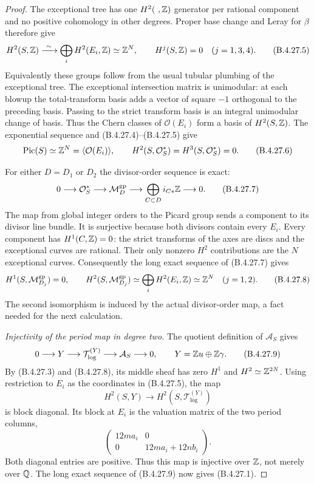 \begin{proof}
The exceptional tree has one $H^2(\ ,\mathbb Z)$
generator per rational component and no positive
cohomology in other degrees. Proper base change
and Leray for $\beta$ therefore give
\[
 H^2(S,\Z)\xrightarrow{\ \sim\ }
       \bigoplus_i H^2(E_i,\Z)\simeq\Z^N,
 \qquad H^j(S,\Z)=0\quad(j=1,3,4).
 \tag{B.4.27.5}
\]
Equivalently these groups follow from the usual
tubular plumbing of the exceptional tree.
The exceptional intersection matrix is
unimodular: at each blowup the total-transform
basis adds a vector of square $-1$ orthogonal
to the preceding basis. Passing to the strict
transform basis is an integral unimodular
change of basis. Thus the Chern classes of
$\mathcal O(E_i)$ form a basis of
$H^2(S,\mathbb Z)$. The exponential sequence and
(B.4.27.4)--(B.4.27.5) give
\[
 \operatorname{Pic}(S)\simeq\mathbb Z^N
       =\langle\mathcal O(E_i)\rangle,
 \qquad
 H^2(S,\mathcal O_S^*)=H^3(S,\mathcal O_S^*)=0.
 \tag{B.4.27.6}
\]

For either $D=D_1$ or $D_2$ the divisor-order
sequence is exact:
\[
 0\longrightarrow\mathcal O_S^*
 \longrightarrow\mathcal M_D^{\mathrm{gp}}
 \longrightarrow
   \bigoplus_{C\subset D}i_{C*}\mathbb Z
 \longrightarrow0.
 \tag{B.4.27.7}
\]
The map from global integer orders to the Picard
group sends a component to its divisor line
bundle. It is surjective because both divisors
contain every $E_i$. Every component has
$H^1(C,\mathbb Z)=0$: the strict transforms of the
axes are discs and the exceptional curves are
rational. Their only nonzero $H^2$ contributions
are the $N$ exceptional curves. Consequently
the long exact sequence of (B.4.27.7) gives
\[
 H^1(S,\mathcal M_{D_j}^{\mathrm{gp}})=0,
 \qquad
 H^2(S,\mathcal M_{D_j}^{\mathrm{gp}})
       \simeq\bigoplus_i H^2(E_i,\mathbb Z)
       \simeq\mathbb Z^N\quad(j=1,2).
 \tag{B.4.27.8}
\]
The second isomorphism is induced by the actual
divisor-order map, a fact needed for the next
calculation.

\emph{Injectivity of the period map in degree two.}
The quotient definition of $\mathcal A_S$ gives
\[
 0\longrightarrow Y\longrightarrow
 \mathcal T_{\log}^{(Y)}\longrightarrow
 \mathcal A_S\longrightarrow0,
 \qquad Y=\mathbb Z u\oplus\mathbb Z\gamma.
 \tag{B.4.27.9}
\]
By (B.4.27.3) and (B.4.27.8), its middle
sheaf has zero $H^1$ and $H^2\simeq\mathbb Z^{2N}$.
Using restriction to $E_i$ as the coordinates
in (B.4.27.5), the map
\[
 H^2(S,Y)\longrightarrow
 H^2(S,\mathcal T_{\log}^{(Y)})
\]
is block diagonal. Its block at $E_i$ is the
valuation matrix of the two period columns,
\[
 \begin{pmatrix}
 12m a_i&0\\0&12m a_i+12n b_i
 \end{pmatrix}.
 \tag{B.4.27.10}
\]
Both diagonal entries are positive. Thus this
map is injective over $\mathbb Z$, not merely over
$\mathbb Q$. The long exact sequence of
(B.4.27.9) now gives (B.4.27.1).


\end{proof}
